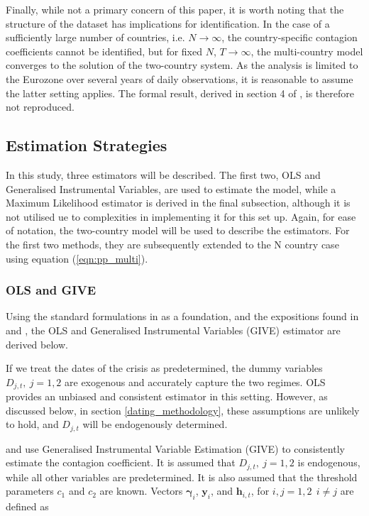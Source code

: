 \documentclass[../base.tex]{subfiles}
\begin{document}
Finally, while not a primary concern of this paper, it is worth noting that the structure of the dataset has implications for identification. In the case of a sufficiently large number of countries, i.e. $N \rightarrow \infty$, the country-specific contagion coefficients cannot be identified, but for fixed $N$, $T \rightarrow \infty$, the multi-country model converges to the solution of the two-country system. As the analysis is limited to the Eurozone over several years of daily observations, it is reasonable to assume the latter setting applies. The formal result, derived in section 4 of \cite{pesaran2007econometric}, is therefore not reproduced.


\subsection{Estimation Strategies}
\label{est_strat}

In this study, three estimators will be described. The first two, OLS and Generalised Instrumental Variables, are used to estimate the model, while a Maximum Likelihood estimator is derived in the final subsection, although it is not utilised ue to complexities in implementing it for this set up. Again, for ease of notation, the two-country model will be used to describe the estimators. For the first two methods, they are subsequently extended to the N country case using equation (\ref{eqn:pp_multi}).

\subsubsection{OLS and GIVE}

Using the standard formulations in \cite{hayashi2000econometrics} as a foundation, and the expositions found in \cite{pesaran2007econometric} and \cite{massacci2007identification}, the OLS and Generalised Instrumental Variables (GIVE) estimator are derived below.

If we treat the dates of the crisis as predetermined, the dummy variables $D_{j,t}, ~ j = 1, 2$ are exogenous and accurately capture the two regimes. OLS provides an unbiased and consistent estimator in this setting. However, as discussed below, in section \ref{dating_methodology}, these assumptions are unlikely to hold, and $D_{j,t}$ will be endogenously determined. 

\cite{pesaran2007econometric} and \cite{metiu2012sovereign} use Generalised Instrumental Variable Estimation (GIVE) to consistently estimate the contagion coefficient. It is assumed that $D_{j,t},~ j = 1, 2$ is endogenous, while all other variables are predetermined. It is also assumed that the threshold parameters $c_1$ and $c_2$ are known. Vectors $\boldsymbol{\gamma}_i$, $\mathbf{y}_i$, and $\mathbf{h}_{i,t}$, for $i,j = 1,2 ~~ i \neq j$ are defined as 
\end{document}
